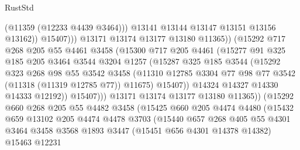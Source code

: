 \begin{lexlean}{RustStd}
\begin{coremodule}
{{{{{{{{{{{{{{{{{{{                                (@11359 (@12233 @4439 @3464)))
                              @13141
                              @13144
                              @13147
                              @13151
                              @13156
                              @13162))
                          @15407)))
                    @13171
                    @13174
                    @13177
                    @13180
                    @11365))
                (@15292
                  @717
                  @268
                  @205
                  @55
                  @4461
                  @3458
                  (@15300
                    @717
                    @205
                    @4461
                    (@15277
                      @91
                      @325
                      @185
                      @205
                      @3464
                      @3544
                      @3204
                      @1257
                      (@15287
                        @325
                        @185
                        @3544
                        (@15292
                          @323
                          @268
                          @98
                          @55
                          @3542
                          @3458
                          (@11310
                            @12785
                            @3304
                            @77
                            @98
                            @77
                            @3542
                            (@11318 (@11319 @12785 @77))
                            @11675)
                          @15407))
                      @14324
                      @14327
                      @14330
                      @14333
                      @12192))
                  @15407)))
            @13171
            @13174
            @13177
            @13180
            @11365))
        (@15292
          @660
          @268
          @205
          @55
          @4482
          @3458
          (@15425
            @660
            @205
            @4474
            @4480
            (@15432
              @659
              @13102
              @205
              @4474
              @4478
              @3703
              (@15440
                @657
                @268
                @405
                @55
                @4301
                @3464
                @3458
                @3568
                @1893
                @3447
                (@15451 @656 @4301 @14378 @14382)
                @15463
                @12231
}}}}}}}}}}}}}}}}}}}
\end{coremodule}
\end{lexlean}
